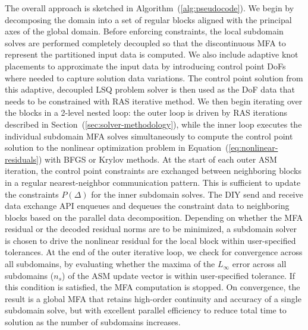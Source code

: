 \documentclass[conference]{IEEEtran}
\newcommand{\Remark}[1]{{\color{RED}\sf Remark: {#1}}}
\newcommand{\eqt}[1]{Equation~(\ref{#1})}
\newcommand{\sect}[1]{Section~(\ref{#1})}
\newcommand{\algo}[1]{Algorithm~(\ref{#1})}
\begin{document}
The overall approach is sketched in \algo{alg:pseudocode}.
We begin by decomposing the domain into a set of regular blocks aligned with the principal axes
of the global domain. Before enforcing constraints, the local subdomain solves are performed completely decoupled so that the discontinuous MFA to represent the partitioned input data is computed. We also include adaptive knot placements to approximate the input data by introducing control point DoFs where needed to capture solution data variations. The control point solution from this adaptive, decoupled LSQ problem solver is then used as the DoF data that needs to be constrained with RAS iterative method.
We then begin iterating over the blocks in a 2-level nested loop: the outer loop is driven by RAS
iterations described in \sect{sec:solver-methodology}, while the inner loop executes the individual subdomain MFA solves simultaneously to compute the control point solution to the nonlinear optimization problem in \eqt{eq:nonlinear-residuals}
with BFGS or Krylov methods. 
At the start of each outer ASM iteration, the control point constraints are exchanged between neighboring blocks in a regular nearest-neighbor communication pattern. This is sufficient to update the constraints $P(\Delta)$ for the inner subdomain solves. The DIY send and receive data exchange API enqueues and dequeues the constraint data to neighboring blocks based on the parallel data decomposition.
Depending on whether the MFA residual or the decoded residual norms are to be minimized, a subdomain solver is chosen to drive the nonlinear residual for the local block within user-specified tolerances.
At the end of the outer iterative loop, we check for convergence across all subdomains, by evaluating whether the maxima of the $L_{\infty}$ error across all subdomains ($n_s$) of the ASM update vector is within user-specified tolerance. If this condition is satisfied, the MFA computation is stopped.
On convergence, the result is a global MFA that retains high-order continuity and accuracy of a single subdomain solve, but with excellent parallel efficiency to reduce total time to solution as the number of subdomains increases.

\end{document}
